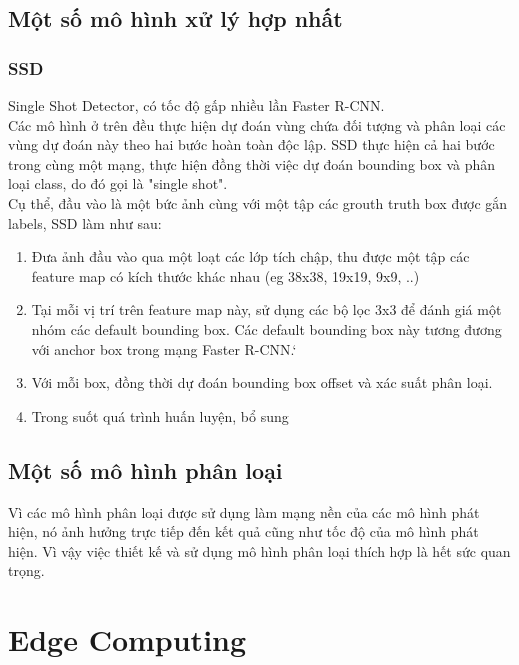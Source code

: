 \documentclass[a4paper]{report}
\begin{document}
\subsection{Một số mô hình xử lý hợp nhất}
\subsubsection{SSD}
Single Shot Detector, có tốc độ gấp nhiều lần Faster R-CNN. \\

Các mô hình ở trên đều thực hiện dự đoán vùng chứa đối tượng và phân loại các 
vùng dự đoán này theo hai bước hoàn toàn độc lập. SSD thực hiện cả hai bước trong
cùng một mạng, thực hiện đồng thời việc dự đoán bounding box và phân loại class,
 do đó gọi là "single shot".\\

Cụ thể, đầu vào là một bức ảnh cùng với một tập các grouth truth box được gắn labels, SSD làm như sau:
\begin{enumerate}
	\item Đưa ảnh đầu vào qua một loạt các lớp tích chập, thu được một tập các feature map có kích thước khác nhau (eg 38x38, 19x19, 9x9, ..)
	\item Tại mỗi vị trí trên feature map này, sử dụng các bộ lọc 3x3 để đánh giá một nhóm các default bounding box. Các default bounding box này tương đương với anchor box trong mạng Faster R-CNN.`
	\item Với mỗi box, đồng thời dự đoán bounding box offset và xác suất phân loại. 
	\item Trong suốt quá trình huấn luyện, bổ sung
\end{enumerate}

\subsection{Một số mô hình phân loại}
Vì các mô hình phân loại được sử dụng làm mạng nền của các mô hình phát hiện, nó ảnh hưởng trực tiếp đến kết quả cũng như tốc độ của mô hình phát hiện. Vì vậy việc thiết kế và sử dụng mô hình phân loại thích hợp là hết sức quan trọng. \\


\section{Edge Computing}
\end{document}
